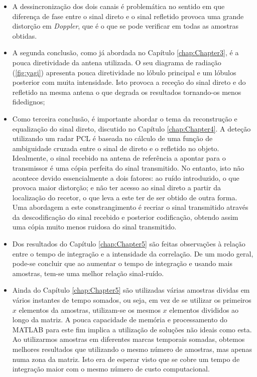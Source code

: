 \begin{itemize}
\item A dessincronização dos dois canais é problemática no sentido em que diferença de fase entre o sinal direto e o sinal refletido provoca uma grande distorção em \textit{Doppler}, que é o que se pode verificar em todas as amostras obtidas. 


\item A segunda conclusão, como já abordada no Capítulo \ref{chap:Chapter3}, é a pouca diretividade da antena utilizada. O seu diagrama de radiação (\ref{fig:yagi}) apresenta pouca diretividade no lóbulo principal e um lóbulos posterior com muita intensidade. Isto provoca a receção do sinal direto e do refletido na mesma antena o que degrada os resultados tornando-os menos fidedignos;


\item Como terceira conclusão, é importante abordar o tema da reconstrução e equalização do sinal direto, discutido no Capítulo \ref{chap:Chapter4}. A deteção utilizando um radar \gls{PCL} é baseada no cálculo de uma função de ambiguidade cruzada entre o sinal de direto e o refletido no objeto. Idealmente, o sinal recebido na antena de referência a apontar para o transmissor é uma cópia perfeita do sinal transmitido. No entanto, isto não acontece devido essencialmente a dois fatores: ao ruído introduzido, o que provoca maior distorção; e não ter acesso ao sinal direto a partir da localização do recetor, o que leva a este ter de ser obtido de outra forma. Uma abordagem a este constrangimento é recriar o sinal transmitido através da descodificação do sinal recebido e posterior codificação, obtendo assim uma cópia muito menos ruidosa do sinal transmitido.


\item Dos resultados do Capítulo \ref{chap:Chapter5} são feitas observações à relação entre o tempo de integração e a intensidade da correlação. De um modo geral, pode-se concluir que ao aumentar o tempo de integração e usando mais amostras, tem-se uma melhor relação sinal-ruído.


\item Ainda do Capítulo \ref{chap:Chapter5} são utilizadas várias amostras dividas em vários instantes de tempo somados, ou seja, em vez de se utilizar os primeiros $x$ elementos da amostras, utilizam-se os mesmos $x$ elementos divididos ao longo da matriz. A pouca capacidade de memória e processamento do MATLAB para este fim implica a utilização de soluções não ideais como esta. Ao utilizarmos amostras em diferentes marcas temporais somadas, obtemos melhores resultados que utilizando o mesmo número de amostras, mas apenas numa zona da matriz. Isto era de esperar visto que se cobre um tempo de integração maior com o mesmo número de custo computacional.



\end{itemize}

